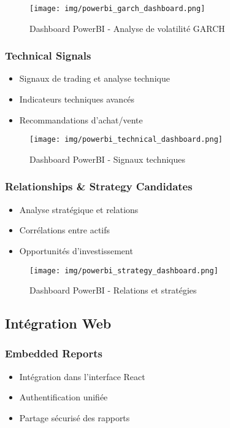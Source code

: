 \begin{figure}[H]
    \centering
    \texttt{[image: img/powerbi\_garch\_dashboard.png]}
    \caption{Dashboard PowerBI - Analyse de volatilité GARCH}
    \label{fig:powerbi_garch_dashboard}
\end{figure}

\subsubsection{Technical Signals}
\begin{itemize}
    \item Signaux de trading et analyse technique
    \item Indicateurs techniques avancés
    \item Recommandations d'achat/vente
\end{itemize}

\begin{figure}[H]
    \centering
    \texttt{[image: img/powerbi\_technical\_dashboard.png]}
    \caption{Dashboard PowerBI - Signaux techniques}
    \label{fig:powerbi_technical_dashboard}
\end{figure}

\subsubsection{Relationships \& Strategy Candidates}
\begin{itemize}
    \item Analyse stratégique et relations
    \item Corrélations entre actifs
    \item Opportunités d'investissement
\end{itemize}

\begin{figure}[H]
    \centering
    \texttt{[image: img/powerbi\_strategy\_dashboard.png]}
    \caption{Dashboard PowerBI - Relations et stratégies}
    \label{fig:powerbi_strategy_dashboard}
\end{figure}

\subsection{Intégration Web}
\subsubsection{Embedded Reports}
\begin{itemize}
    \item Intégration dans l'interface React
    \item Authentification unifiée
    \item Partage sécurisé des rapports
\end{itemize}

